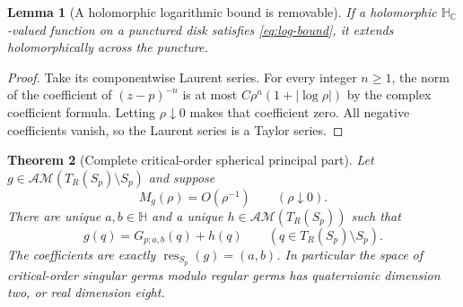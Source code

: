 \documentclass[11pt,a4paper]{article}
\numberwithin{equation}{section}
\newtheorem{theorem}{Theorem}[section]
\newtheorem{lemma}[theorem]{Lemma}
\theoremstyle{definition}
\theoremstyle{remark}
\newcommand{\C}{\mathbb C}
\newcommand{\HH}{\mathbb H}
\newcommand{\HC}{\mathbb H_{\C}}
\newcommand{\AM}{\mathcal{AM}}
\begin{document}
\begin{lemma}[A holomorphic logarithmic bound is removable]
\label{lem:hol-removable}
If a holomorphic $\HC$-valued function on a punctured disk satisfies
\eqref{eq:log-bound}, it extends holomorphically across the puncture.
\end{lemma}
\begin{proof}
Take its componentwise Laurent series. For every integer $n\ge1$,
the norm of the coefficient of $(z-p)^{-n}$ is at most
$C\rho^n(1+|\log\rho|)$ by the complex coefficient formula.
Letting $\rho\downarrow0$ makes that coefficient zero. All negative
coefficients vanish, so the Laurent series is a Taylor series.
\end{proof}

\begin{theorem}[Complete critical-order spherical principal part]
\label{thm:critical}
Let $g\in\AM(T_R(S_p)\setminus S_p)$ and suppose
\begin{equation}
 M_g(\rho)=O(\rho^{-1})\qquad(\rho\downarrow0).
 \label{eq:critical-bound}
\end{equation}
There are unique $a,b\in\HH$ and a unique $h\in\AM(T_R(S_p))$ such that
\begin{equation}
 g(q)=G_{p;a,b}(q)+h(q)\qquad(q\in T_R(S_p)\setminus S_p).
 \label{eq:critical-decomposition}
\end{equation}
The coefficients are exactly $\operatorname{res}_{S_p}(g)=(a,b)$.
In particular the space of critical-order singular germs modulo regular
germs has quaternionic dimension two, or real dimension eight.
\end{theorem}
\end{document}
